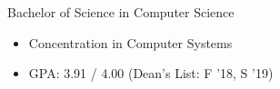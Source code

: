 %
%
%


\begin{projects}

    {Bachelor of Science in Computer Science}
    {
    \begin{itemize}
        \item Concentration in Computer Systems
		\item GPA: 3.91 / 4.00 \hspace{1em}(Dean's List: F '18, S '19)
	\end{itemize}
    }

\end{projects}
